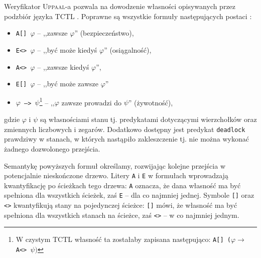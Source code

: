 \documentclass{pracamgr}
\newcommand{\upp}{\textsc{Uppaal}}
\theoremstyle{plain}
\begin{document}
Weryfikator \upp-a pozwala na dowodzenie własności opisywanych przez
podzbiór języka TCTL \cite{acd:mc}. Poprawne są wszystkie formuły
następujących postaci \cite{by-lncs04}:
\begin{itemize}
  \item \texttt{A[] $\varphi$} -- ,,zawsze $\varphi$'' (bezpieczeństwo),
  \item \texttt{E<> $\varphi$} -- ,,być może kiedyś $\varphi$''
  (osiągalność),
  \item \texttt{A<> $\varphi$} -- ,,zawsze kiedyś $\varphi$'',
  \item \texttt{E[] $\varphi$} -- ,,być może zawsze $\varphi$''
  \item \texttt{$\varphi$ --> $\psi$}\footnote{W czystym TCTL własność
    ta zostałaby zapisana następująco: \texttt{A[]
      ($\varphi\rightarrow$ A<> $\psi)$}} -- ,,$\varphi$ zawsze
  prowadzi do $\psi$'' (żywotność),
\end{itemize}
gdzie $\varphi$ i $\psi$ są własnościami stanu tj. predykatami
dotyczącymi wierzchołków oraz zmiennych liczbowych i zegarów.
Dodatkowo dostępny jest predykat \texttt{deadlock} prawdziwy w
stanach, w których nastąpiło zakleszczenie tj. nie można wykonać
żadnego dozwolonego przejścia.

Semantykę powyższych formuł określamy, rozwijając kolejne
przejścia w potencjalnie nieskończone drzewo. Litery \texttt{A} i
\texttt{E} w formułach wprowadzają kwantyfikację po ścieżkach tego drzewa:
\texttt{A} oznacza, że dana własność ma być spełniona dla wszystkich
ścieżek, zaś \texttt{E} -- dla co najmniej jednej. Symbole
\texttt{[]} oraz \texttt{<>} kwantyfikują stany na pojedynczej
ścieżce: \texttt{[]} mówi, że własność ma być spełniona dla wszystkich
stanach na ścieżce, zaś \texttt{<>} -- w co najmniej jednym.
\end{document}
